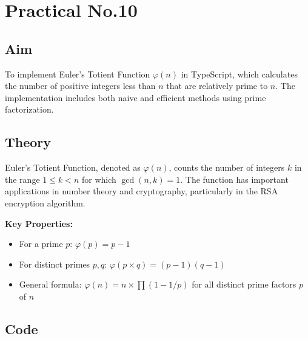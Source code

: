 \documentclass[a4paper,12pt]{article}
\begin{document}
\section*{Practical No.10}

\subsection*{Aim}
To implement Euler's Totient Function $\varphi(n)$ in TypeScript, which calculates the number of positive integers less than $n$ that are relatively prime to $n$. The implementation includes both naive and efficient methods using prime factorization.

\vspace{0.5cm}

\subsection*{Theory}
Euler's Totient Function, denoted as $\varphi(n)$, counts the number of integers $k$ in the range $1 \leq k < n$ for which $\gcd(n, k) = 1$. The function has important applications in number theory and cryptography, particularly in the RSA encryption algorithm.

\textbf{Key Properties:}
\begin{itemize}
    \item For a prime $p$: $\varphi(p) = p - 1$
    \item For distinct primes $p, q$: $\varphi(p \times q) = (p-1)(q-1)$
    \item General formula: $\varphi(n) = n \times \prod(1 - 1/p)$ for all distinct prime factors $p$ of $n$
\end{itemize}

\vspace{0.5cm}

\subsection*{Code}
\end{document}
